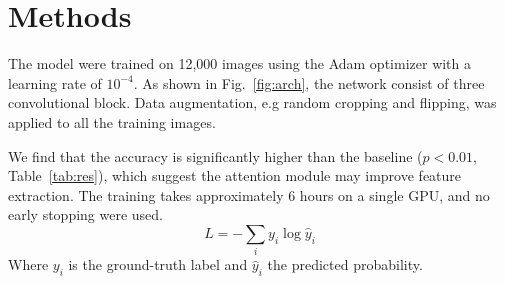 \section{Methods}
\label{sec:methods}
The model were trained on 12,000 images using the Adam optimizer \cite{kingma2015} with a learning rate of $10^{-4}$. As shown in Fig.~\ref{fig:arch}, the network consist of three convolutional block. Data augmentation, e.g random cropping and flipping, was applied to all the training images.

We find that the accuracy is significantly higher than the baseline ($p < 0.01$, Table~\ref{tab:res}), which suggest the attention module may improve feature extraction. The training takes approximately 6 hours on a single GPU, and no early stopping were used.
\begin{equation}
L = -\sum_i y_i \log \hat{y}_i
\end{equation}
Where $y_i$ is the ground-truth label and $\hat{y}_i$ the predicted probability.
